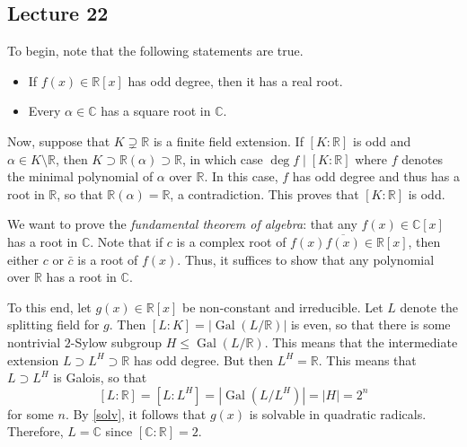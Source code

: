 \documentclass[10pt,letterpaper,cm]{nupset}
\theoremstyle{definition}
\theoremstyle{theorem}
\theoremstyle{remark}
\newcommand{\C}{\mathbb C}
\newcommand{\R}{\mathbb R}
\newcommand{\1}{\mathbf{1}}
\newcommand{\0}{\vec 0}
\DeclareMathOperator{\gal}{Gal}
\begin{document}
\subsection{Lecture 22}

To begin, note that the following statements are true.
\begin{itemize}
\item If $f(x) \in \R[x]$ has odd degree, then it has a real root.
\item Every $\alpha \in \C$ has a square root in $\C$.
\end{itemize}
Now, suppose that $K \supsetneq \R$ is a finite field extension. If $[K : \R]$ is odd and $\alpha \in K \setminus \R$, then $K \supset \R(\alpha) \supset \R$, in which case $\deg{f} \mid [K : \R]$ where $f$ denotes the minimal polynomial of $\alpha$ over $\R$.  In this case, $f$ has odd degree and thus has a root in $\R$, so that $\R(\alpha) = \R$, a contradiction. This proves that $[K : \R]$ is odd.

We want to prove the \textit{fundamental theorem of algebra}: that any $f(x) \in \C[x]$ has a root in $\C$. Note that if $c$ is a complex root of $f(x)\overline{f(x)} \in \R[x]$, then either $c$ or $\bar{c}$ is a root of $f(x)$.  Thus, it suffices to show that any polynomial over $\R$ has a root in $\C$.

To this end, let $g(x) \in \R[x]$ be non-constant and irreducible. Let $L$ denote the splitting field for $g$. Then $[L :K] = \left\lvert{\gal(L/\R)}\right\rvert$ is even, so that there is some nontrivial $2$-Sylow subgroup $H \leq \gal(L/\R)$. This means that the intermediate extension $L \supset L^H \supset \R$ has odd degree. But then $L^H = \R$. This means that $L \supset L^H$ is Galois, so that $$\left[L: \R\right] = \left[L: L^H\right] = \left\lvert{\gal(L/L^H)}\right\rvert = \left\lvert{H}\right\rvert = 2^n$$ for some $n$. By \cref{solv}, it follows that $g(x)$ is solvable in quadratic radicals. Therefore, $L = \C$ since $[\C : \R] = 2$. 
\end{document}
